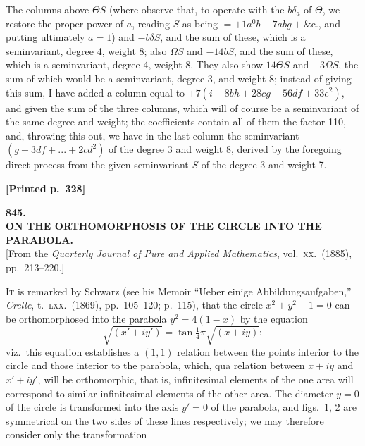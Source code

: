 \documentclass[11pt]{article}
\begin{document}
\medskip

\noindent The columns above $\Theta S$ (where observe that, to operate with the $b\delta_{a}$ of $\Theta$, we restore the proper power of $a$, reading $S$ as being $= +1a^{0}b - 7abg + \&\mathrm{c}.$, and putting ultimately $a = 1$) and $-b\delta S$, and the sum of these, which is a seminvariant, degree 4, weight 8; also $\Omega S$ and $-14 b S$, and the sum of these, which is a seminvariant, degree 4, weight 8. They also show $14\Theta S$ and $-3\Omega S$, the sum of which would be a seminvariant, degree 3, and weight 8; instead of giving this sum, I have added a column equal to $+7(i - 8bh + 28cg - 56df + 33e^{2})$, and given the sum of the three columns, which will of course be a seminvariant of the same degree and weight; the coefficients contain all of them the factor 110, and, throwing this out, we have in the last column the seminvariant $(g - 3df + ... + 2cd^{2})$ of the degree 3 and weight 8, derived by the foregoing direct process from the given seminvariant $S$ of the degree 3 and weight 7.


\newpage

\noindent\textbf{[Printed p.~328]}\hfill

\bigskip

\begin{center}
{\large\textbf{845.}}\\[0.7em]
{\large\textbf{ON THE ORTHOMORPHOSIS OF THE CIRCLE INTO THE\\ PARABOLA.}}\\[1em]
{\small [From the \textit{Quarterly Journal of Pure and Applied Mathematics}, vol.\ \textsc{xx}.\ (1885), pp.\ 213--220.]}
\end{center}

\bigskip

\noindent I\textsc{t} is remarked by Schwarz (see his Memoir ``Ueber einige Abbildungsaufgaben,'' \textit{Crelle}, t.\ \textsc{lxx}.\ (1869), pp.\ 105--120; p.~115), that the circle $x^{2} + y^{2} - 1 = 0$ can be orthomorphosed into the parabola $y^{2} = 4(1 - x)$ by the equation
\[
\sqrt{(x' + iy')} = \tan\tfrac{1}{4}\pi\sqrt{(x + iy)}:
\]
viz.\ this equation establishes a $(1, 1)$ relation between the points interior to the circle and those interior to the parabola, which, qua relation between $x + iy$ and $x' + iy'$, will be orthomorphic, that is, infinitesimal elements of the one area will correspond to similar infinitesimal elements of the other area. The diameter $y = 0$ of the circle is transformed into the axis $y' = 0$ of the parabola, and figs.\ 1, 2 are symmetrical on the two sides of these lines respectively; we may therefore consider only the transformation
\end{document}
